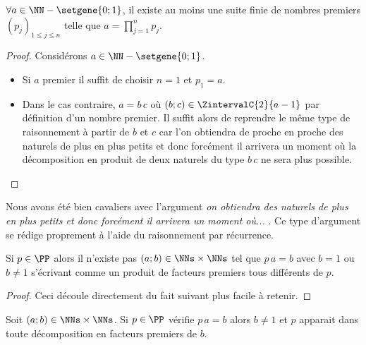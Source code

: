 \begin{fact} \label{exists-decompo}
	$\forall a \in \NN - \setgene{0 ; 1}$, il existe au moins une suite finie de nombres premiers $(p_j)_{1 \leq j \leq n}$
	telle que $\displaystyle a = \prod_{j=1}^{n} p_j$. 
\end{fact}

\begin{proof}
	Considérons $a \in \NN - \setgene{0 ; 1}$.
	
	\begin{itemize}[label=\small\textbullet]
		\item Si $a$ premier il suffit de choisir $n = 1$ et $p_1 = a$.
	
	
		\item Dans le cas contraire, $a = b \, c$ où $(b ; c) \in \ZintervalC{2}{a-1}$ par définition d'un nombre premier.
		Il suffit alors de reprendre le même type de raisonnement à partir de $b$ et $c$ car l'on obtiendra de proche en proche des naturels de plus en plus petits et donc forcément il arrivera un moment où la décomposition en produit de deux naturels du type $b \, c$ ne sera plus possible.
	\end{itemize}
\end{proof}


\begin{unproved}
	Nous avons été bien cavaliers avec l'argument \emph{\og on obtiendra des naturels de plus en plus petits et donc forcément il arrivera un moment où... \fg}. Ce type d'argument se rédige proprement à l'aide du raisonnement par récurrence.

\end{unproved}



\begin{fact} \label{pseudo-prime-divisor}
	Si $p \in \PP$ alors il n'existe pas $(a ; b) \in \NNs \times \NNs$ tel que
	$p \, a = b$ avec $b = 1$ ou $b \neq 1$ s'écrivant comme un produit de facteurs premiers tous différents de $p$.
\end{fact}
	

\begin{proof}
	Ceci découle directement du fait suivant plus facile à retenir.
\end{proof}



\begin{fact} \label{prime-divisor}
	Soit
	$(a ; b) \in \NNs \times \NNs$.
	Si $p \in \PP$ vérifie $p \, a = b$ alors $b \neq 1$ et $p$ apparait dans toute décomposition en facteurs premiers de $b$.
\end{fact}
	

